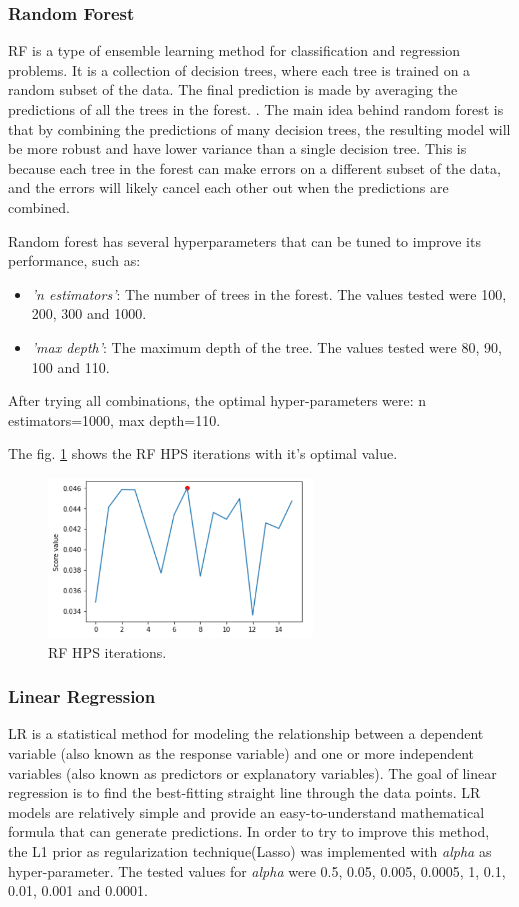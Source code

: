\documentclass[journal]{IEEEtran} %
\begin{document}
\subsubsection{Random Forest}
RF is a type of ensemble learning method for classification and regression problems. It is a collection of decision trees, where each tree is trained on a random subset of the data. The final prediction is made by averaging the predictions of all the trees in the forest. \cite{diagnostics11122242}. The main idea behind random forest is that by combining the predictions of many decision trees, the resulting model will be more robust and have lower variance than a single decision tree. This is because each tree in the forest can make errors on a different subset of the data, and the errors will likely cancel each other out when the predictions are combined. 

Random forest has several hyperparameters that can be tuned to improve its performance, such as:
\begin{itemize}
  \item \textit{'n estimators'}: The number of trees in the forest. The values tested were 100, 200, 300 and 1000.
  \item \textit{'max depth'}: The maximum depth of the tree. The values tested were 80, 90, 100 and 110.
\end{itemize}

After trying all combinations, the optimal hyper-parameters were: n estimators=1000, max depth=110.

The fig. \ref{fig:rf_h} shows the RF HPS iterations with it's optimal value.
\begin{figure}[htp]
    \centering
    \includegraphics[width=7cm]{Project2-Report_FAA/figures/rf_hyper.png}
    \caption{RF HPS iterations.}
    \label{fig:rf_h}
\end{figure}


\subsubsection{Linear Regression}
LR is a statistical method for modeling the relationship between a dependent variable (also known as the response variable) and one or more independent variables (also known as predictors or explanatory variables). The goal of linear regression is to find the best-fitting straight line through the data points. LR models are relatively simple and provide an easy-to-understand mathematical formula that can generate predictions. In order to try to improve this method, the L1 prior as regularization technique(Lasso) was implemented with \textit{alpha} as hyper-parameter. The tested values for \textit{alpha} were 0.5, 0.05, 0.005, 0.0005, 1, 0.1, 0.01, 0.001 and 0.0001.
\end{document}
